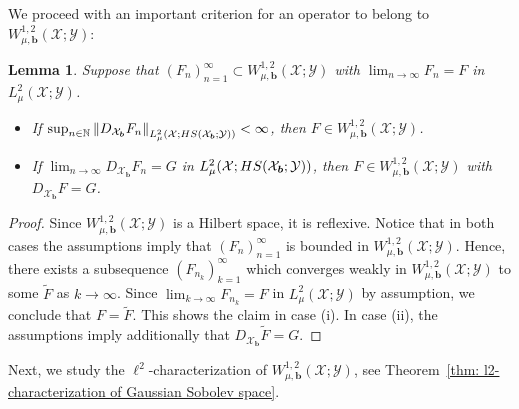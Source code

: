 \documentclass[namedate,webpdf]{ima-authoring-template-blank}
\newcommand*{\HS}{\textup{HS}}
\newcommand*{\nm}[1]{{\left\|#1\right \|}}
\newcounter{counter}
\numberwithin{counter}{section}
\numberwithin{equation}{section}
\theoremstyle{plain}
\newtheorem{lemma}[counter]{Lemma}
\theoremstyle{definition}
\newcommand*{\cX}{\mathcal{X}}
\newcommand*{\cY}{\mathcal{Y}}
\newcommand*{\bbN}{\mathbb{N}}
\newcommand*{\wtF}{\widetilde{F}}
\theoremstyle{thmstyletwo}
\begin{document}
We proceed with an important criterion for an operator to belong to \( W_{\mu, \bm{b}}^{1, 2}(\cX; \cY)\):

\begin{lemma}
\label{lem: belonging to W^1,2}
    Suppose that \((F_n)_{n = 1}^{\infty} \subset W_{\mu, \bm{b}}^{1,2}(\cX; \cY)\) with \(\lim_{n \to \infty} F_n = F\) in \(L_{\mu}^2(\cX; \cY)\).
    \begin{itemize}
        \item [(i)] If \(\sup_{n\in\bbN} \nm{D_{\cX_{\bm{b}}} F_n}_{L^2_{\mu}(\cX; \HS(\cX_{\bm{b}}; \cY))} < \infty\), then \(F \in W_{\mu, \bm{b}}^{1,2}(\cX; \cY)\). 
        \item [(ii)] If \( \lim_{n \to \infty} D_{\cX_{\bm{b}}} F_n = G \) in \( L^2_{\mu}(\cX; \HS(\cX_{\bm{b}}; \cY)) \), then \(F \in W_{\mu, \bm{b}}^{1,2}(\cX; \cY)\) with \( D_{\cX_{\bm{b}}} F = G \).
    \end{itemize}
\end{lemma}

\begin{proof}
    Since \(W_{\mu, \bm{b}}^{1,2}(\cX; \cY)\) is a Hilbert space, it is reflexive. Notice that in both cases the assumptions imply that \((F_n)_{n = 1}^{\infty}\) is bounded in \(W_{\mu, \bm{b}}^{1,2}(\cX; \cY)\). Hence, there exists a subsequence \((F_{n_k})_{k = 1}^{\infty}\) which converges weakly in \(W_{\mu, \bm{b}}^{1,2}(\cX; \cY)\) to some \(\wtF\) as \(k \to \infty\). Since \( \lim_{k \to \infty} F_{n_k} = F \) in \(L_{\mu}^2(\cX; \cY)\) by assumption, we conclude that \(F = \wtF\). This shows the claim in case (i). In case (ii), the assumptions imply additionally that \( D_{\cX_{\bm{b}}} \wtF = G \).
\end{proof}

Next, we study the \(\ell^2\)-characterization of \(W_{\mu, \bm{b}}^{1, 2}(\cX; \cY)\), see Theorem~\ref{thm: l2-characterization of Gaussian Sobolev space}.
\end{document}
